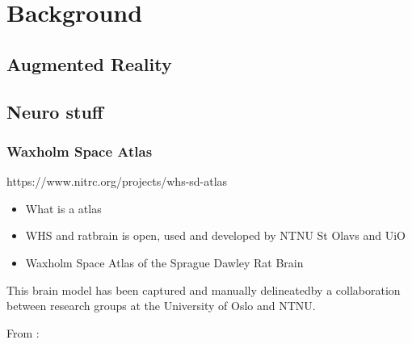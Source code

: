 


\chapter{Background}

\section{Augmented Reality}

\section{Neuro stuff}

\subsection*{Waxholm Space Atlas}\label{chap:ratbrain}

https://www.nitrc.org/projects/whs-sd-atlas
\begin{itemize}
    \item What is a atlas
    \item WHS and ratbrain is open, used and developed by NTNU St Olavs and UiO 
    \item Waxholm Space Atlas of the Sprague Dawley Rat Brain 
\end{itemize}

This brain model has been captured and manually delineated\footnotemark by a collaboration between research groups at the University of Oslo and NTNU.


\noindent From \citet{WaxholmSpace2011}: 


